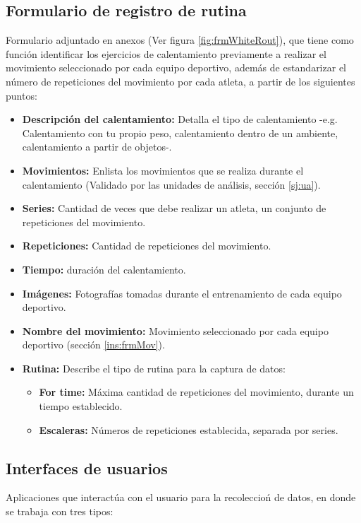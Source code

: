 \subsection{Formulario de registro de rutina} \label{ins:frmRout}
Formulario adjuntado en anexos (Ver figura \ref{fig:frmWhiteRout}), que tiene como funci\'on identificar los ejercicios de calentamiento  previamente a realizar el movimiento seleccionado por cada equipo deportivo, adem\'as de estandarizar el n\'umero de repeticiones del movimiento por cada atleta, a partir de los siguientes puntos:
\begin{itemize}
	\item \textbf{Descripci\'on del calentamiento:} Detalla el tipo de calentamiento -e.g. Calentamiento con tu propio peso, calentamiento dentro de un ambiente, calentamiento a partir de objetos-.
	\item \textbf{Movimientos:} Enlista los movimientos que se realiza durante el calentamiento (Validado por las unidades de an\'alisis, secci\'on  \ref{sj:ua}).
	\item \textbf{Series:} Cantidad de veces que debe realizar un atleta, un conjunto de repeticiones del movimiento.
	\item \textbf{Repeticiones:} Cantidad de repeticiones del movimiento.
	\item \textbf{Tiempo:} duraci\'on del calentamiento.
	\item \textbf{Im\'agenes:} Fotograf\'ias tomadas durante el entrenamiento de cada equipo deportivo.
	\item \textbf{Nombre del movimiento:} Movimiento seleccionado por cada equipo deportivo  (secci\'on  \ref{ins:frmMov}).
	\item \textbf{Rutina:} Describe el tipo de rutina para la captura de datos:
	\begin{itemize}
		\item \textbf{For time:} M\'axima cantidad de repeticiones del movimiento, durante un tiempo establecido.
		\item \textbf{Escaleras:} N\'umeros de repeticiones establecida, separada por series.
	\end{itemize}	
\end{itemize}
\subsection{Interfaces de usuarios} \label{ins:UI}
Aplicaciones que interact\'ua con el usuario para la recoleccio\'n de datos, en donde se trabaja con  tres tipos:
